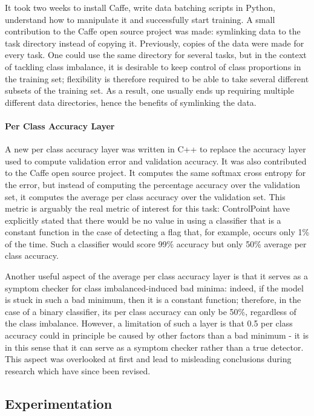 \documentclass[a4paper,11pt]{article}
\begin{document}
It took two weeks to install Caffe, write data batching scripts in Python, understand how to manipulate it and successfully start training. A small contribution to the Caffe open source project was made: symlinking data to the task directory instead of copying it. Previously, copies of the data were made for every task. One could use the same directory for several tasks, but in the context of tackling class imbalance, it is desirable to keep control of class proportions in the training set; flexibility is therefore required to be able to take several different subsets of the training set. As a result, one usually ends up requiring multiple different data directories, hence the benefits of symlinking the data. 


\paragraph{Per Class Accuracy Layer}

A new per class accuracy layer was written in C++ to replace the accuracy layer used to compute validation error and validation accuracy. It was also contributed to the Caffe open source project. It computes the same softmax cross entropy for the error, but instead of computing the percentage accuracy over the validation set, it computes the average per class accuracy over the validation set. This metric is arguably the real metric of interest for this task: ControlPoint have explicitly stated that there would be no value in using a classifier that is a constant function in the case of detecting a flag that, for example, occurs only 1\% of the time. Such a classifier would score 99\% accuracy but only 50\% average per class accuracy.

Another useful aspect of the average per class accuracy layer is that it serves as a symptom checker for class imbalanced-induced bad minima: indeed, if the model is stuck in such a bad minimum, then it is a constant function; therefore, in the case of a binary classifier, its per class accuracy can only be 50\%, regardless of the class imbalance. However, a limitation of such a layer is that 0.5 per class accuracy could in principle be caused by other factors than a bad minimum - it is in this sense that it can serve as a symptom checker rather than a true detector. This aspect was overlooked at first and lead to misleading conclusions during research which have since been revised. 


\subsection{Experimentation}
\end{document}
